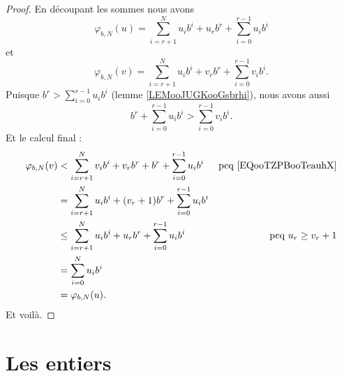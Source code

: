 \begin{proof}
    En découpant les sommes nous avons
    \begin{equation}
        \varphi_{b,N}(u)=\sum_{i=r+1}^Nu_ib^i+u_rb^r+\sum_{i=0}^{r-1}u_ib^i
    \end{equation}
    et
    \begin{equation}
        \varphi_{b,N}(v)=\sum_{i=r+1}^Nu_ib^i+v_rb^r+\sum_{i=0}^{r-1}v_ib^i.
    \end{equation}
    Puisque \( b^r>\sum_{i=0}^{r-1}u_ib^i\) (lemme \ref{LEMooJUGKooGsbrhi}), nous avons aussi
    \begin{equation}        \label{EQooTZPBooTeauhX}
        b^r+\sum_{i=0}^{r-1}u_ib^i>\sum_{i=0}^{r-1}v_ib^i.
    \end{equation}
    Et le calcul final :
    \begin{subequations}
        \begin{align}
            \varphi_{b,N}(v)&<\sum_{i=r+1}^Nv_ib^i+v_rb^r+b^r+\sum_{i=0}^{r-1}u_ib^i &\text{pcq \eqref{EQooTZPBooTeauhX}}\\
            &=\sum_{i=r+1}^Nu_ib^i+(v_r+1)b^r+\sum_{i=0}^{r-1}u_ib^i\\
            &\leq \sum_{i=r+1}^Nu_ib^i+u_rb^r+\sum_{i=0}^{r-1}u_ib^i        &\text{pcq } u_r\geq v_r+1\\
            &=\sum_{i=0}^Nu_ib^i\\
            &=\varphi_{b,N}(u).
        \end{align}
    \end{subequations}
    Et voilà.
\end{proof}




\section{Les entiers}

